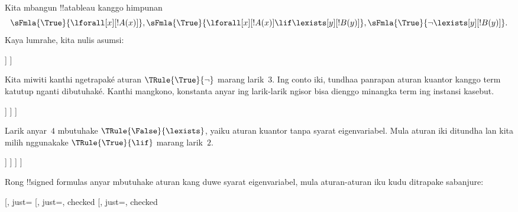\documentclass[../../../include/open-logic-section]{subfiles}
\begin{document}
\begin{ex}
Kita mbangun !!a{tableau} kanggo himpunan
\[
\sFmla{\True}{\lforall[x][!A(x)]}, \sFmla{\True}{\lforall[x][!A(x)] 
  \lif \lexists[y][!B(y)]}, \sFmla{\True}{\lnot\lexists[y][!B(y)]}.
\]
Kaya lumrahe, kita nulis asumsi:
\begin{oltableau}
  [\sFmla{\True}{\lforall[x][\formula{A}(x)]}, just=\TAss
    [\sFmla{\True}{\lforall[x][\formula{A}(x)] \lif
        \lexists[y][\formula{B}(y)]}, just=\TAss
      [\sFmla{\True}{\lnot\lexists[y][\formula{B}(y)]}, just=\TAss
      ]
    ]
  ]
\end{oltableau}
Kita miwiti kanthi ngetrapaké aturan $\TRule{\True}{\lnot}$ marang
larik~$3$. Ing conto iki, tundhaa panrapan aturan kuantor kanggo
term katutup nganti dibutuhaké. Kanthi mangkono, konstanta anyar ing larik-larik ngisor bisa dienggo
minangka term ing instansi kasebut.
\begin{oltableau}
  [\sFmla{\True}{\lforall[x][\formula{A}(x)]}, just=\TAss
    [\sFmla{\True}{\lforall[x][\formula{A}(x)] \lif
        \lexists[y][\formula{B}(y)]}, just=\TAss
      [\sFmla{\True}{\lnot\lexists[y][\formula{B}(y)]}, just=\TAss, checked
        [\sFmla{\False}{\lexists[y][\formula{B}(y)]}, just={\TRule{\True}{\lnot}[3]}]
      ]
    ]
  ]
\end{oltableau}
Larik anyar~$4$ mbutuhake $\TRule{\False}{\lexists}$, yaiku aturan
kuantor tanpa syarat eigenvariabel. Mula aturan iki ditundha lan kita
milih nggunakake $\TRule{\True}{\lif}$ marang larik~$2$.
\begin{oltableau}
  [\sFmla{\True}{\lforall[x][\formula{A}(x)]}, just=\TAss
    [\sFmla{\True}{\lforall[x][\formula{A}(x)] \lif
        \lexists[y][\formula{B}(y)]}, just=\TAss, checked
      [\sFmla{\True}{\lnot\lexists[y][\formula{B}(y)]}, just=\TAss, checked
        [\sFmla{\False}{\lexists[y][\formula{B}(y)]},
          just={\TRule{\True}{\lnot}[3]},
          [\sFmla{\False}{\lforall[x][\formula{A}(x)]}, just={\TRule{\True}{\lif}[2]}]
          [\sFmla{\True}{\lexists[y][\formula{B}(y)]}, just={\TRule{\True}{\lif}[2]}]
        ]
      ]
    ]
  ]
\end{oltableau}
Rong !!{signed formula}s anyar mbutuhake aturan kang duwe syarat
eigenvariabel, mula aturan-aturan iku kudu ditrapake sabanjure:
\begin{oltableau}
  [\sFmla{\True}{\lforall[x][\formula{A}(x)]}, just=\TAss
    [\sFmla{\True}{\lforall[x][\formula{A}(x)] \lif
        \lexists[y][\formula{B}(y)]}, just=\TAss, checked
      [\sFmla{\True}{\lnot\lexists[y][\formula{B}(y)]}, just=\TAss, checked

\end{oltableau}
\end{ex}
\end{document}
